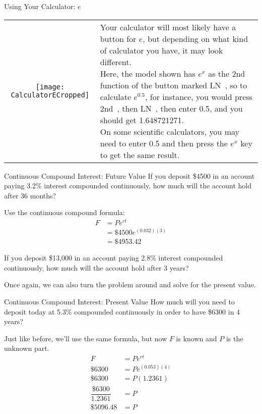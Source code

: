 \begin{proc}{Using Your Calculator: $e$}
\begin{tabular}{c l}
\texttt{[image: CalculatorECropped]} & \parbox[b]{3in}{Your calculator will most likely have a button for $e$, but depending on what kind of calculator you have, it may look different.\\

Here, the model shown has $e^x$ as the 2nd function of the button marked $\boxed{\textrm{LN}}$\ , so to calculate $e^{0.5}$, for instance, you would press $\boxed{\textrm{2nd}}$\ , then $\boxed{\textrm{LN}}$\ , then enter 0.5, and you should get 1.648721271.\\

On some scientific calculators, you may need to enter 0.5 and then press the $\boxed{e^x}$ key to get the same result.}
\end{tabular}
\end{proc}
\pagebreak

\begin{example}[https://www.youtube.com/watch?v=kfZ-xUCgLl8&list=PLfmpjsIzhztsZtnb7HnXrQ8SLoiOCIcAM&index=20]{Continuous Compound Interest: Future Value}
If you deposit \$4500 in an account paying 3.2\% interest compounded continuously, how much will the account hold after 36 months?

\sol
Use the continuous compound formula:
\begin{align*}
F &= Pe^{rt}\\
&= \$4500e^{(0.032)(3)}\\
&= \boxed{\$4953.42}
\end{align*}
\end{example}

\begin{try}
If you deposit \$13,000 in an account paying 2.8\% interest compounded continuously, how much will the account hold after 3 years?
\end{try}
\vfill

Once again, we can also turn the problem around and solve for the present value.
\vfill

\begin{example}[https://www.youtube.com/watch?v=vzk6AvZS3h8&list=PLfmpjsIzhztsZtnb7HnXrQ8SLoiOCIcAM&index=21]{Continuous Compound Interest: Present Value}
How much will you need to deposit today at 5.3\% compounded continuously in order to have \$6300 in 4 years?

\sol
Just like before, we'll use the same formula, but now $F$ is known and $P$ is the unknown part.
\begin{align*}
F &= Pe^{rt}\\
\$6300 &= Pe^{(0.053)(4)}\\
\$6300 &= P(1.2361)\\
\dfrac{\$6300}{1.2361} &= P\\
\boxed{\$5096.48} &= P
\end{align*}
\end{example}
\vfill


